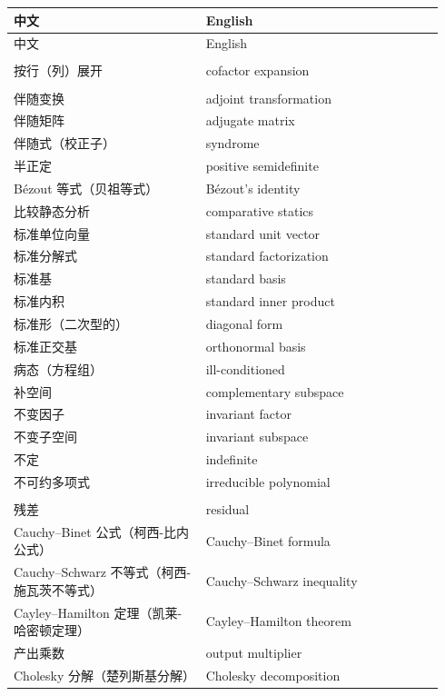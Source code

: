 {\small
	\begin{longtable}{p{0.42\linewidth}p{0.52\linewidth}}
		\toprule
		中文 & English \\
		\midrule
		\endfirsthead
		\toprule
		中文 & English \\
		\midrule
		\endhead
		\bottomrule
		\endfoot
		\multicolumn{2}{l}{\textbf{\sffamily A}} \\
		按行（列）展开 & cofactor expansion \\
		\addlinespace
		\multicolumn{2}{l}{\textbf{\sffamily B}} \\
		伴随变换 & adjoint transformation \\
		伴随矩阵 & adjugate matrix \\
		伴随式（校正子） & syndrome \\
		半正定 & positive semidefinite \\
		Bézout 等式（贝祖等式） & Bézout's identity \\
		比较静态分析 & comparative statics \\
		标准单位向量 & standard unit vector \\
		标准分解式 & standard factorization \\
		标准基 & standard basis \\
		标准内积 & standard inner product \\
		标准形（二次型的） & diagonal form \\
		标准正交基 & orthonormal basis \\
		病态（方程组） & ill-conditioned \\
		补空间 & complementary subspace \\
		不变因子 & invariant factor \\
		不变子空间 & invariant subspace \\
		不定 & indefinite \\
		不可约多项式 & irreducible polynomial \\
		\addlinespace
		\multicolumn{2}{l}{\textbf{\sffamily C}} \\
		残差 & residual \\
		Cauchy–Binet 公式（柯西-比内公式） & Cauchy–Binet formula \\
		Cauchy–Schwarz 不等式（柯西-施瓦茨不等式） & Cauchy–Schwarz inequality \\
		Cayley–Hamilton 定理（凯莱-哈密顿定理） & Cayley–Hamilton theorem \\
		产出乘数 & output multiplier \\
		Cholesky 分解（楚列斯基分解） & Cholesky decomposition \\

\end{longtable}}
